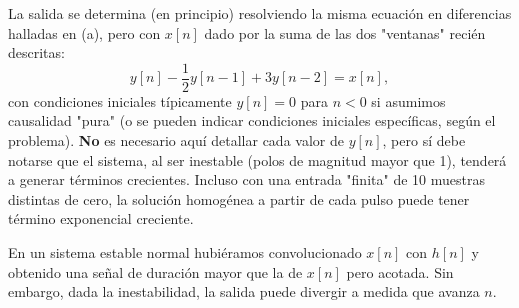 \begin{enumerate}[label=\color{red}\textbf{\arabic*)}]
\begin{enumerate}[label=\color{red}\textbf{\alph*)}]
            La salida se determina (en principio) resolviendo la misma ecuación en diferencias halladas en (a), pero con $x[n]$ dado por la suma de las dos "ventanas" recién descritas:  \[
                y[n]-\dfrac{1}{2}y[n-1]+3y[n-2]=x[n],
            \] con condiciones iniciales típicamente $y[n]=0$ para  $n<0$ si asumimos causalidad "pura" (o se pueden indicar condiciones iniciales específicas, según el problema).  \textbf{No} es necesario aquí detallar cada valor de $y[n]$, pero sí debe notarse que el sistema, al ser inestable (polos de magnitud mayor que 1), tenderá a generar términos crecientes. Incluso con una entrada "finita" de 10 muestras distintas de cero, la solución homogénea a partir de cada pulso puede tener término exponencial creciente.

            En un sistema estable normal hubiéramos convolucionado $x[n]$ con  $h[n]$ y obtenido una señal de duración mayor que la de  $x[n]$ pero acotada. Sin embargo, dada la inestabilidad, la salida puede divergir a medida que avanza  $n$.


\end{enumerate}
\end{enumerate}
